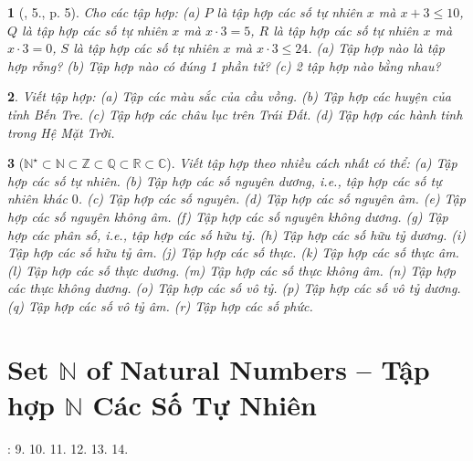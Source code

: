 \documentclass{article}
\newtheorem{baitoan}{}
\begin{document}
\begin{baitoan}[\cite{Tuyen_Toan_6}, 5., p. 5]
	Cho các tập hợp: (a) $P$ là tập hợp các số tự nhiên $x$ mà $x + 3\le10$, $Q$ là tập hợp các số tự nhiên $x$ mà $x\cdot3 = 5$, $R$ là tập hợp các số tự nhiên $x$ mà $x\cdot3 = 0$, $S$ là tập hợp các số tự nhiên $x$ mà $x\cdot3\le24$. (a) Tập hợp nào là tập hợp rỗng? (b) Tập hợp nào có đúng 1 phần tử? (c) 2 tập hợp nào bằng nhau?
\end{baitoan}

\begin{baitoan}
	Viết tập hợp: (a) Tập các màu sắc của cầu vồng. (b) Tập hợp các huyện của tỉnh Bến Tre. (c) Tập hợp các châu lục trên Trái Đất. (d) Tập hợp các hành tinh trong Hệ Mặt Trời.
\end{baitoan}

\begin{baitoan}[$\mathbb{N}^\star\subset\mathbb{N}\subset\mathbb{Z}\subset\mathbb{Q}\subset\mathbb{R}\subset\mathbb{C}$]
	Viết tập hợp theo nhiều cách nhất có thể: (a) Tập hợp các số tự nhiên. (b) Tập hợp các số nguyên dương, i.e., tập hợp các số tự nhiên khác $0$. (c) Tập hợp các số nguyên. (d) Tập hợp các số nguyên âm. (e) Tập hợp các số nguyên không âm. (f) Tập hợp các số nguyên không dương. (g) Tập hợp các phân số, i.e., tập hợp các số hữu tỷ. (h) Tập hợp các số hữu tỷ dương. (i) Tập hợp các số hữu tỷ âm. (j) Tập hợp các số thực. (k) Tập hợp các số thực âm. (l) Tập hợp các số thực dương. (m) Tập hợp các số thực không âm. (n) Tập hợp các thực không dương. (o) Tập hợp các số vô tỷ. (p) Tập hợp các số vô tỷ dương. (q) Tập hợp các số vô tỷ âm. (r) Tập hợp các số phức.
\end{baitoan}


\section{Set $\mathbb{N}$ of Natural Numbers -- Tập hợp $\mathbb{N}$ Các Số Tự Nhiên}
\cite[\S2, pp. 8--9]{SBT_Toan_6_Canh_Dieu_tap_1}: 9. 10. 11. 12. 13. 14.
\end{document}
